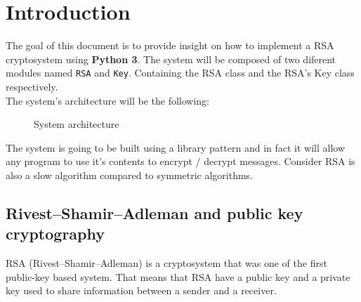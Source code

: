 \documentclass[usenames,dvipsnames,12pt]{report}
\begin{document}


\tableofcontents

\listoffigures

\chapter{Introduction}

The goal of this document is to provide insight on how to implement a RSA cryptosystem
using \textbf{Python 3}. The system will be composed of two diferent modules named
\texttt{RSA} and \texttt{Key}. Containing the RSA class and the RSA's Key class respectively.\\

The system's architecture will be the following:

\begin{figure}[H]
    \centering

    \caption{System architecture}
    \label{fig:system}
\end{figure}

The system is going to be built using a library pattern and in fact it will allow any program
to use it's contents to encrypt / decrypt messages. Consider RSA is also a slow algorithm compared
to symmetric algorithms.

\section{Rivest–Shamir–Adleman and public key cryptography}

RSA (Rivest–Shamir–Adleman) is a cryptosystem that was one of the first public-key based system.
That means that RSA have a public key and a private key used to share information between a sender
and a receiver.
\end{document}
